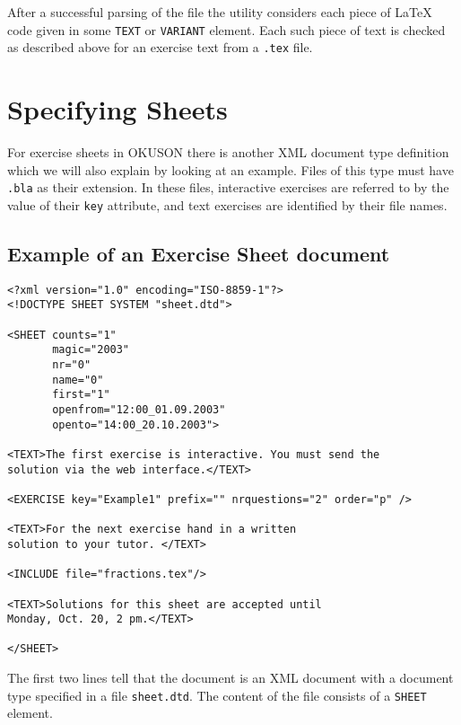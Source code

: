 \documentclass[12pt,openany,a4paper]{book}
\newcommand{\OKUSON}{\textsf{OKUSON}}
\begin{document}
After a successful parsing of the file the utility considers each piece of
{\LaTeX} code given in some \texttt{TEXT} or \texttt{VARIANT} element.
Each such piece of text is checked as described above for an 
exercise text from a \texttt{.tex} file.


\section{Specifying Sheets}\label{sec:Sheets}

For exercise sheets in {\OKUSON} there is another XML document type
definition which we will also explain by looking at an example. Files of
this type must have \texttt{.bla} as their extension. In these files,
interactive exercises are referred to by the value of their \texttt{key}
attribute, and text exercises are identified by their file names.

\subsection*{Example of an Exercise Sheet document}

\begin{verbatim}
<?xml version="1.0" encoding="ISO-8859-1"?>
<!DOCTYPE SHEET SYSTEM "sheet.dtd">

<SHEET counts="1" 
       magic="2003"
       nr="0"
       name="0"
       first="1"
       openfrom="12:00_01.09.2003"
       opento="14:00_20.10.2003">

<TEXT>The first exercise is interactive. You must send the 
solution via the web interface.</TEXT>

<EXERCISE key="Example1" prefix="" nrquestions="2" order="p" />

<TEXT>For the next exercise hand in a written 
solution to your tutor. </TEXT>

<INCLUDE file="fractions.tex"/>

<TEXT>Solutions for this sheet are accepted until 
Monday, Oct. 20, 2 pm.</TEXT>

</SHEET>
\end{verbatim}

The first two lines tell that the document is an XML document with a
document type specified in a file \texttt{sheet.dtd}.
The content of the file consists of a \texttt{SHEET} element.
\end{document}
